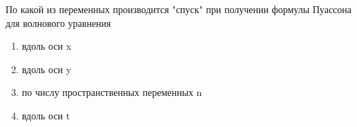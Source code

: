 По какой из переменных производится "спуск" при получении формулы Пуассона для волнового уравнения

\begin{enumerate}[label=\arabic*)]
    \item вдоль оси x
    \item вдоль оси y
    \item по числу пространственных переменных n
    \item вдоль оси t
\end{enumerate}

